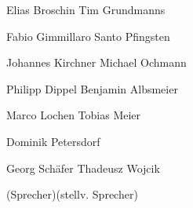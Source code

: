 \documentclass[a4paper, 11pt]{article} %
\begin{document}
\hrulefill \hfill \hrulefill

Elias Broschin \hfill Tim Grundmanns

\vspace{2.0cm}
\hrulefill \hfill \hrulefill

Fabio Gimmillaro \hfill Santo Pfingsten

\vspace{2.0cm}
\hrulefill \hfill \hrulefill

Johannes Kirchner \hfill Michael Ochmann

\pagebreak
\vspace{2.0cm}
\hrulefill \hfill \hrulefill

Philipp Dippel \hfill Benjamin Albsmeier

\vspace{2.0cm}
\hrulefill \hfill \hrulefill

Marco Lochen \hfill Tobias Meier

\vspace{2.0cm}
\hrulefill \hfill \hfill \hfill

Dominik Petersdorf \hfill \hfill

\vspace{3.5cm}
\hrulefill \hfill \hrulefill

Georg Schäfer \hfill Thadeusz Wojcik

{\footnotesize (Sprecher)\hfill (stellv. Sprecher)}
\end{document}
